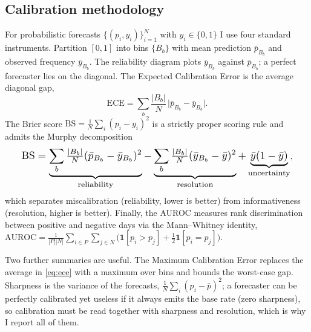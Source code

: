 \documentclass[10pt,twocolumn]{article}
\theoremstyle{definition}
\begin{document}
\subsection{Calibration methodology}
\label{sec:calmethod}

For probabilistic forecasts $\{(p_i,y_i)\}_{i=1}^N$ with $y_i\in\{0,1\}$ I use
four standard instruments. Partition $[0,1]$ into bins $\{B_b\}$ with mean
prediction $\bar p_{B_b}$ and observed frequency $\bar y_{B_b}$. The
reliability diagram plots $\bar y_{B_b}$ against $\bar p_{B_b}$; a perfect
forecaster lies on the diagonal. The Expected Calibration Error
\citep{guo2017} is the average diagonal gap,
\begin{equation}
\mathrm{ECE}=\sum_b\frac{|B_b|}{N}\,\big|\bar p_{B_b}-\bar y_{B_b}\big|.
\label{eq:ece}
\end{equation}
The Brier score $\mathrm{BS}=\frac1N\sum_i(p_i-y_i)^2$ is a strictly proper
scoring rule \citep{brier1950,gneiting2007} and admits the Murphy decomposition
\citep{murphy1973}
\begin{equation}
\resizebox{0.92\columnwidth}{!}{$\displaystyle
\mathrm{BS}=\underbrace{\sum_b\tfrac{|B_b|}{N}(\bar p_{B_b}-\bar y_{B_b})^2}_{\text{reliability}}
-\underbrace{\sum_b\tfrac{|B_b|}{N}(\bar y_{B_b}-\bar y)^2}_{\text{resolution}}
+\underbrace{\bar y(1-\bar y)}_{\text{uncertainty}}$},
\label{eq:murphy}
\end{equation}
which separates miscalibration (reliability, lower is better) from informativeness
(resolution, higher is better). Finally, the AUROC measures rank
discrimination between positive and negative days via the Mann--Whitney identity,
$\mathrm{AUROC}=\frac{1}{|P||N|}\sum_{i\in P}\sum_{j\in N}\big(\mathbf 1[p_i>p_j]+\tfrac12\mathbf 1[p_i=p_j]\big)$.

Two further summaries are useful. The Maximum Calibration Error replaces
the average in \eqref{eq:ece} with a maximum over bins and bounds the worst-case
gap. Sharpness is the variance of the forecasts, $\frac1N\sum_i(p_i-\bar
p)^2$; a forecaster can be perfectly calibrated yet useless if it always emits the
base rate (zero sharpness), so calibration must be read together with sharpness
and resolution, which is why I report all of them.
\end{document}
